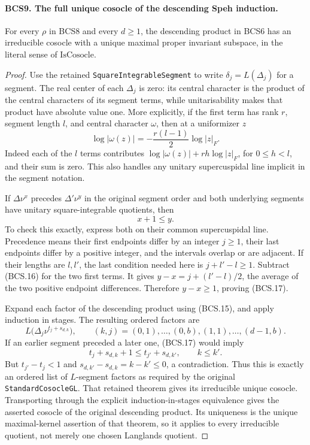 \paragraph{BCS9. The full unique cosocle of the descending Speh induction.}
\label{claim:BCS9}
For every \(\rho\) in BCS8 and every \(d\ge1\), the descending
product in BCS6 has an irreducible cosocle with a unique maximal
proper invariant subspace, in the literal sense of
\(\mathrm{IsCosocle}\).
\begin{proof}
Use the retained \texttt{SquareIntegrableSegment} to write
\(\delta_j=L(\Delta_j)\) for a segment.  The real center of each
\(\Delta_j\) is zero: its central character is the product of the
central characters of its segment terms, while unitarisability makes
that product have absolute value one.  More explicitly, if the first
term has rank \(r\), segment length \(l\), and central character
\(\omega\), then at a uniformizer \(z\)
\[
 \log|\omega(z)|=-\frac{r(l-1)}2\log|z|_F.
 \tag{BCS.16}
\]
Indeed each of the \(l\) terms contributes
\(\log|\omega(z)|+rh\log|z|_F\), for \(0\le h<l\),
and their sum is zero.  This also handles any unitary supercuspidal
line implicit in the segment notation.

If \(\Delta\nu^x\) precedes \(\Delta'\nu^y\) in the original
segment order and both underlying segments have unitary
square-integrable quotients, then
\[
                             x+1\le y.
 \tag{BCS.17}
\]
To check this exactly, express both on their common supercuspidal
line.  Precedence means their first endpoints differ by an integer
\(j\ge1\), their last endpoints differ by a positive integer,
and the intervals overlap or are adjacent.  If their lengths are
\(l,l'\), the last condition needed here is \(j+l'-l\ge1\).
Subtract (BCS.16) for the two first terms.  It gives
\(y-x=j+(l'-l)/2\), the average of the two positive endpoint
differences.  Therefore \(y-x\ge1\), proving (BCS.17).

Expand each factor of the descending product using (BCS.15), and
apply induction in stages.  The resulting ordered factors are
\[
          L\bigl(\Delta_j\nu^{t_j+s_{d,k}}\bigr),
       \qquad (k,j)=(0,1),\ldots,(0,b),(1,1),\ldots,(d-1,b).
 \tag{BCS.18}
\]
If an earlier segment preceded a later one, (BCS.17) would imply
\[
        t_j+s_{d,k}+1\le t_{j'}+s_{d,k'},\qquad k\le k'.
\]
But \(t_{j'}-t_j<1\) and
\(s_{d,k'}-s_{d,k}=k-k'\le0\), a contradiction.  Thus this is
exactly an ordered list of \(L\)-segment factors as required by
the original \texttt{StandardCosocleGL}.  That retained theorem
gives its irreducible unique cosocle.  Transporting through the
explicit induction-in-stages equivalence gives the asserted cosocle
of the original descending product.  Its uniqueness is the unique
maximal-kernel assertion of that theorem, so it applies to every
irreducible quotient, not merely one chosen Langlands quotient.
\end{proof}


